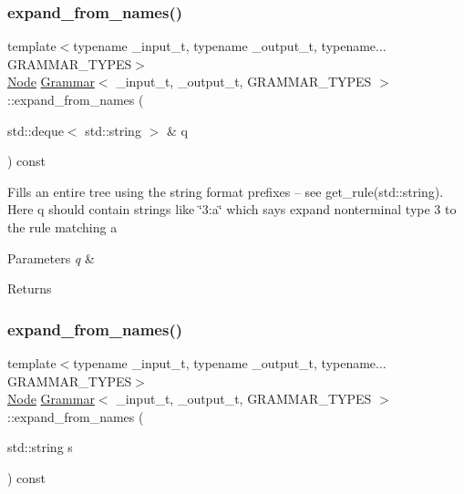 \mbox{\label{class_grammar_acd13159e6ec71f73b5398ba5a56ac109}} 
\subsubsection{\texorpdfstring{expand\+\_\+from\+\_\+names()}{expand\_from\_names()}\hspace{0.1cm}{\footnotesize\ttfamily [1/3]}}
{\footnotesize\ttfamily template$<$typename \+\_\+input\+\_\+t, typename \+\_\+output\+\_\+t, typename... G\+R\+A\+M\+M\+A\+R\+\_\+\+T\+Y\+P\+ES$>$ \\
\hyperlink{class_node}{Node} \hyperlink{class_grammar}{Grammar}$<$ \+\_\+input\+\_\+t, \+\_\+output\+\_\+t, G\+R\+A\+M\+M\+A\+R\+\_\+\+T\+Y\+P\+ES $>$\+::expand\+\_\+from\+\_\+names (\begin{DoxyParamCaption}\item[{std\+::deque$<$ std\+::string $>$ \&}]{q }\end{DoxyParamCaption}) const\hspace{0.3cm}{\ttfamily [inline]}}

Fills an entire tree using the string format prefixes -- see get\+\_\+rule(std\+::string). Here q should contain strings like \char`\"{}3\+:\textquotesingle{}a\textquotesingle{}\char`\"{} which says expand nonterminal type 3 to the rule matching \textquotesingle{}a\textquotesingle{} 
\begin{DoxyParams}{Parameters}
{\em q} & \\
\hline
\end{DoxyParams}
\begin{DoxyReturn}{Returns}

\end{DoxyReturn}
\mbox{\label{class_grammar_a5ce6aa2e9804ddf12cc98a385ef2f633}} 
\subsubsection{\texorpdfstring{expand\+\_\+from\+\_\+names()}{expand\_from\_names()}\hspace{0.1cm}{\footnotesize\ttfamily [2/3]}}
{\footnotesize\ttfamily template$<$typename \+\_\+input\+\_\+t, typename \+\_\+output\+\_\+t, typename... G\+R\+A\+M\+M\+A\+R\+\_\+\+T\+Y\+P\+ES$>$ \\
\hyperlink{class_node}{Node} \hyperlink{class_grammar}{Grammar}$<$ \+\_\+input\+\_\+t, \+\_\+output\+\_\+t, G\+R\+A\+M\+M\+A\+R\+\_\+\+T\+Y\+P\+ES $>$\+::expand\+\_\+from\+\_\+names (\begin{DoxyParamCaption}\item[{std\+::string}]{s }\end{DoxyParamCaption}) const\hspace{0.3cm}{\ttfamily [inline]}}


